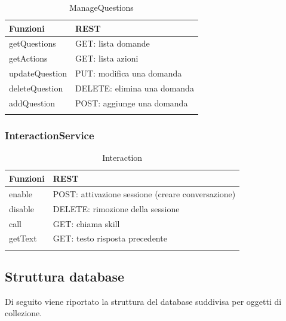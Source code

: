 \documentclass[../DefinizioneDiProdotto.tex]{subfiles}
\begin{document}
		\begin{longtable}[c] { >{\centering\arraybackslash}p{3cm} >{\centering\arraybackslash}p{6cm}}
				\toprule
				\centerline{\textbf{Funzioni}} & \centerline{\textbf{REST}} \\
				\midrule
				getQuestions &  GET: lista domande \\
		 		\addlinespace[0.3em]
				\midrule
				\addlinespace[0.3em]
				getActions & GET: lista azioni \\
		 		\addlinespace[0.3em]
				\midrule
				\addlinespace[0.3em]
				updateQuestion & PUT: modifica una domanda \\
		 		\addlinespace[0.3em]
				\midrule
				\addlinespace[0.3em]
				deleteQuestion & DELETE: elimina una domanda \\
				\addlinespace[0.3em]
				\midrule
				\addlinespace[0.3em]
				addQuestion & POST: aggiunge una domanda \\

				\bottomrule
				\caption{ManageQuestions}
		\end{longtable}

	\newpage
	\subsubsection{InteractionService}
	\begin{longtable}[c] { >{\centering\arraybackslash}p{3cm} >{\centering\arraybackslash}p{6cm}}
				\toprule
				\centerline{\textbf{Funzioni}} & \centerline{\textbf{REST}} \\
				\midrule
				enable &  POST: attivazione sessione (creare conversazione) \\
		 		\addlinespace[0.3em]
				\midrule
				\addlinespace[0.3em]
				disable & DELETE: rimozione della sessione \\
		 		\addlinespace[0.3em]
				\midrule
				\addlinespace[0.3em]
				call & GET: chiama skill \\
		 		\addlinespace[0.3em]
				\midrule
				\addlinespace[0.3em]
				getText & GET: testo risposta precedente \\

				\bottomrule
				\caption{Interaction}
		\end{longtable}

	\subsection{Struttura database}
	Di seguito viene riportato la struttura del database suddivisa per oggetti di collezione.
\end{document}
